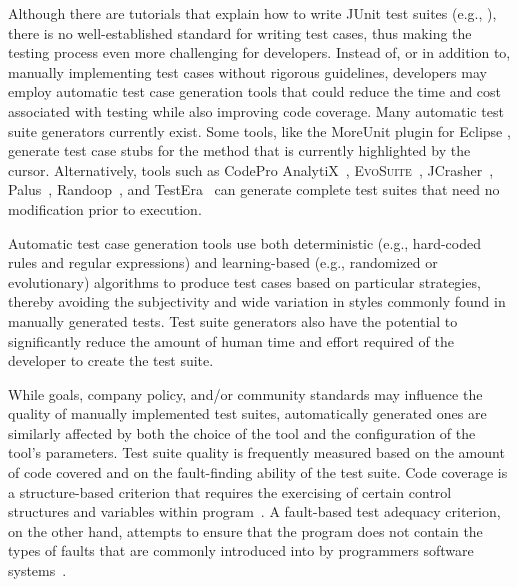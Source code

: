 

Although there are tutorials that explain how to write JUnit test suites (e.g., \cite{vogella2013}), there is no well-established standard for writing test cases, thus making the testing process even more challenging for developers.  Instead of, or in addition to, manually implementing test cases without rigorous guidelines, developers may employ automatic test case generation tools that could reduce the time and cost associated with testing while also improving code coverage.  Many automatic test suite generators currently exist.  Some tools, like the MoreUnit plugin for Eclipse \cite{moreunit}, generate test case stubs for the method that is currently highlighted by the cursor.  Alternatively, tools such as CodePro AnalytiX~\cite{codepro1}, \textsc{EvoSuite}~\cite{fraser:2011:eat:2025113.2025179}, JCrasher~\cite{csallner2004}, Palus~\cite{zhang:2011:pha:1985793.1986036}, Randoop~\cite{pacheco2007feedback}, and TestEra~\cite{marinov:2001:tnf:872023.872551} can generate complete test suites that need no modification prior to execution.



Automatic test case generation tools use both deterministic (e.g., hard-coded rules and regular expressions) and
learning-based (e.g., randomized or evolutionary) algorithms to produce test cases based on particular strategies,
thereby avoiding the subjectivity and wide variation in styles commonly found in manually generated tests.  Test suite
generators also have the potential to significantly reduce the amount of human time and effort required of the developer
to create the test suite.  


While goals, company policy, and/or community standards may influence the quality of manually implemented test suites, automatically generated ones are similarly affected by both the choice of the tool and the configuration of the tool's parameters.  Test suite quality is frequently measured based on the amount of code covered and on the fault-finding ability of the test suite.  Code coverage is a structure-based criterion that requires the exercising of certain control structures and variables within program~\cite{kapfhammer-testing-handbook}. A fault-based test adequacy criterion, on the other hand, attempts to ensure that the program does not contain the types of faults that are commonly introduced into by programmers software systems~\cite{demillo1978hints, zhu1997software}.  

